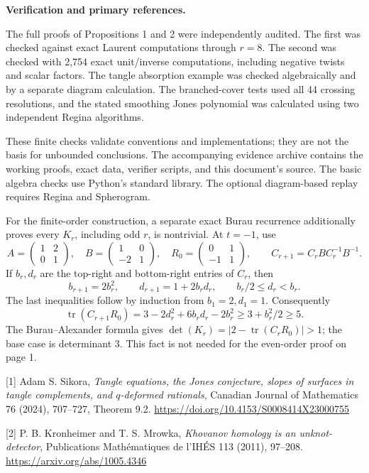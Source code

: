 \documentclass[10pt]{article}
\begin{document}
\newpage
\textbf{Verification and primary references.}

The full proofs of Propositions 1 and 2 were independently audited. The first
was checked against exact Laurent computations through \(r=8\). The second was
checked with 2,754 exact unit/inverse computations, including negative twists
and scalar factors. The tangle absorption example was checked algebraically and
by a separate diagram calculation. The branched-cover tests used all 44 crossing
resolutions, and the stated smoothing Jones polynomial was calculated using two
independent Regina algorithms.

These finite checks validate conventions and implementations; they are not the
basis for unbounded conclusions. The accompanying evidence archive contains
the working proofs, exact data, verifier scripts, and this document's source.
The basic algebra checks use Python's standard library. The optional
diagram-based replay requires Regina and Spherogram.

For the finite-order construction, a separate exact Burau recurrence additionally
proves every \(K_r\), including odd \(r\), is nontrivial. At \(t=-1\), use
\[
 A=\begin{pmatrix}1&2\\0&1\end{pmatrix},\quad
 B=\begin{pmatrix}1&0\\-2&1\end{pmatrix},\quad
 R_0=\begin{pmatrix}0&1\\-1&1\end{pmatrix},\qquad
 C_{r+1}=C_rBC_r^{-1}B^{-1}.
\]
If \(b_r,d_r\) are the top-right and bottom-right entries of \(C_r\), then
\[
 b_{r+1}=2b_r^2,\qquad d_{r+1}=1+2b_rd_r,\qquad
 b_r/2\leq d_r<b_r.
\]
The last inequalities follow by induction from \(b_1=2,d_1=1\).
Consequently
\[
 \operatorname{tr}(C_{r+1}R_0)
 =3-2d_r^2+6b_rd_r-2b_r^2
 \geq3+b_r^2/2\geq5.
\]
The Burau--Alexander formula gives
\(\det(K_r)=|2-\operatorname{tr}(C_rR_0)|>1\);
the base case is determinant \(3\). This fact is not needed for the even-order
proof on page 1.

[1] Adam S. Sikora, \emph{Tangle equations, the Jones conjecture, slopes of surfaces
in tangle complements, and \(q\)-deformed rationals}, Canadian Journal of Mathematics
76 (2024), 707--727, Theorem 9.2.
\url{https://doi.org/10.4153/S0008414X23000755}

[2] P. B. Kronheimer and T. S. Mrowka, \emph{Khovanov homology is an unknot-detector},
Publications Math\'ematiques de l'IH\'ES 113 (2011), 97--208.
\url{https://arxiv.org/abs/1005.4346}
\end{document}
